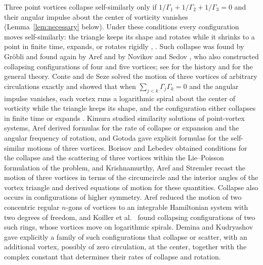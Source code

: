 \documentclass[11pt]{article}
\theoremstyle{definition}
\begin{document}
Three point vortices collapse self-similarly only if $1/\Gamma_1 + 1/\Gamma_2 + 1/\Gamma_3 = 0$ and their angular impulse about the center of vorticity vanishes (Lemma~\ref{lem:necessary} below). Under these conditions every configuration moves self-similarly: the triangle keeps its shape and rotates while it shrinks to a point in finite time, expands, or rotates rigidly \cite[Sect.~4.5.2]{gallay2026}, \cite{kas2018}. Such collapse was found by Gr\"obli \cite{grobli1877} and found again by Aref \cite{aref1979} and by Novikov and Sedov \cite{ns1979}, who also constructed collapsing configurations of four and five vortices; see \cite{art1992} for the history and \cite{newton2001} for the general theory. Conte and de Seze \cite{cds1980} solved the motion of three vortices of arbitrary circulations exactly and showed that when $\sum_{j<k} \Gamma_j \Gamma_k = 0$ and the angular impulse vanishes, each vortex runs a logarithmic spiral about the center of vorticity while the triangle keeps its shape, and the configuration either collapses in finite time or expands \cite[Sect.~4]{cds1980}. Kimura \cite{kimura1987} studied similarity solutions of point-vortex systems, Aref \cite{aref2010} derived formulas for the rate of collapse or expansion and the angular frequency of rotation, and Gotoda \cite{gotoda2021} gave explicit formulas for the self-similar motions of three vortices. Borisov and Lebedev \cite{bl1998} obtained conditions for the collapse and the scattering of three vortices within the Lie--Poisson formulation of the problem, and Krishnamurthy, Aref and Stremler \cite{kas2018} recast the motion of three vortices in terms of the circumcircle and the interior angles of the vortex triangle and derived equations of motion for these quantities. Collapse also occurs in configurations of higher symmetry. Aref \cite{aref1982} reduced the motion of two concentric regular $n$-gons of vortices to an integrable Hamiltonian system with two degrees of freedom, and Koiller et al.\ \cite{koiller1985} found collapsing configurations of two such rings, whose vortices move on logarithmic spirals. Demina and Kudryashov \cite[Sect.~3]{dk2014} gave explicitly a family of such configurations that collapse or scatter, with an additional vortex, possibly of zero circulation, at the center, together with the complex constant that determines their rates of collapse and rotation.
\end{document}
